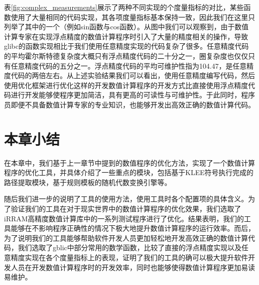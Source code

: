 表\ref{fig:complex_measurements}展示了两种不同实现的个度量指标的对比，某些函数使用了大量相同的代码实现，其各项度量指标基本保持一致，因此我们在这里只列举了其中的一个（例如sin函数与cos函数）。从图中我们可以观察到，由于数值计算专家在实现浮点精度的数值计算程序时引入了大量的精度相关的操作，导致glibc的函数实现相比于我们使用任意精度实现的代码复杂了很多。任意精度代码的平均霍尔斯特德复杂度大概只有浮点精度代码的二十分之一，圈复杂度也仅仅只有任意精度代码的五分之一。浮点精度代码的平均可维护性指为104.47，是任意精度代码的两倍左右。从上述实验结果我们可以看出，使用任意精度编写代码，然后使用优化框架进行优化这样的开发数值计算程序的开发方式比直接使用浮点精度代码进行开发能够使程序更加简洁，具有更高的可读性与可维护性。于此同时，程序员即便不具备数值计算专家的专业知识，也能够开发出高效正确的数值计算代码。

\section{本章小结}

在本章中，我们基于上一章节中提到的数值程序的优化方法，实现了一个数值计算程序的优化工具，并具体介绍了一些重点的模块，包括基于KLEE符号执行完成的路径提取模块，基于规则模板的随机代数变换引擎等。

随后我们进一步的说明了工具的使用方法，使用工具时各个配置项的具体含义。为了验证我们的工具在对于现实世界中的数值计算程序的优化效果，我们选取了iRRAM高精度数值计算库中的一系列测试程序进行了优化。结果表明，我们的工具能够在不影响程序正确性的情况下极大地提升数值计算程序的运行效率。而后，为了说明我们的工具能够帮助软件开发人员更加轻松地开发高效正确的数值计算代码，我们选取了gblic中部分常用的数学函数，比较了直接的浮点精度实现以及任意精度实现在各个度量指标上的表现，证明了我们的工具的确可以极大提升软件开发人员在开发数值计算程序时的开发效率，同时也能够使得数值计算程序更加易读易维护。